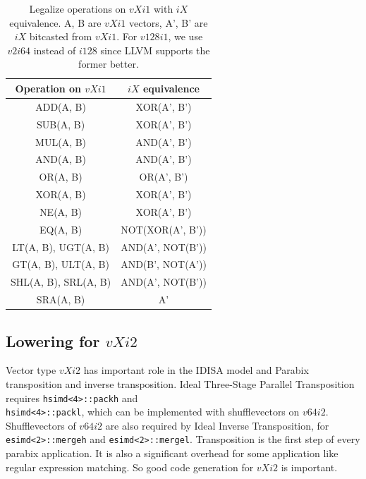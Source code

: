 \begin{table}
  \begin{center}
    \begin{tabular}{|c|c|}
      \hline
      Operation on $vXi1$ & $iX$ equivalence \\ \hline
      ADD(A, B) & XOR(A', B') \\ \hline
      SUB(A, B) & XOR(A', B') \\ \hline
      MUL(A, B) & AND(A', B') \\ \hline
      AND(A, B) & AND(A', B') \\ \hline
      OR(A, B) & OR(A', B') \\ \hline
      XOR(A, B) & XOR(A', B') \\ \hline
      NE(A, B) & XOR(A', B') \\ \hline
      EQ(A, B) & NOT(XOR(A', B')) \\\hline
      LT(A, B), UGT(A, B) & AND(A', NOT(B')) \\\hline
      GT(A, B), ULT(A, B) & AND(B', NOT(A')) \\\hline
      SHL(A, B), SRL(A, B) & AND(A', NOT(B')) \\\hline
      SRA(A, B) & A' \\\hline
    \end{tabular}
  \end{center}
\caption[Legalize operations on $vXi1$ with $iX$ equivalence.]{Legalize operations on $vXi1$ with $iX$ equivalence. A, B are $vXi1$ vectors, A', B' are $iX$ bitcasted from $vXi1$. For $v128i1$, we use $v2i64$ instead of $i128$ since LLVM supports the former better.}
\label{table:vxi1}
\end{table}

\subsection{Lowering for $vXi2$}
Vector type $vXi2$ has important role in the IDISA model and Parabix transposition and inverse transposition. Ideal Three-Stage Parallel Transposition \cite{transposition} requires {\tt hsimd<4>::packh} and \\ {\tt hsimd<4>::packl}, which can be implemented with shufflevectors on $v64i2$. Shufflevectors of $v64i2$ are also required by Ideal Inverse Transposition, for \verb|esimd<2>::mergeh| and \verb|esimd<2>::mergel|. Transposition is the first step of every parabix application\cite{inductive_doubling_principle}. It is also a significant overhead for some application like regular expression matching\cite{rob_regex}. So good code generation for $vXi2$ is important.

